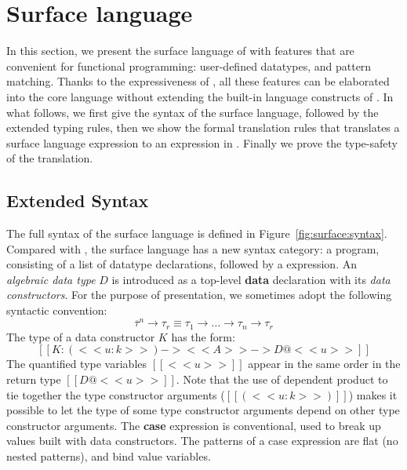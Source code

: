 \newcommand{\FV}{\mathsf{FV}}
\newcommand{\dom}{\mathsf{dom}}

\section{Surface language}
\label{sec:surface}


\newcommand{\sufcc}{$\lambda C_{\mathsf{suf}}$\xspace}

In this section, we present the surface language of \name with features that are convenient for functional programming: user-defined datatypes, and pattern matching. Thanks to the expressiveness of \name, all these features can be elaborated into the core language without extending the built-in language constructs of \name. In what follows, we first give the syntax of the surface language, followed by the extended typing rules, then we show the formal translation rules that translates a surface language expression to an expression in \name. Finally we prove the type-safety of the translation.

\subsection{Extended Syntax}


The full syntax of the surface language is defined in Figure~\ref{fig:surface:syntax}. Compared with \name, the surface language has a new syntax category: a program, consisting of a list of datatype declarations, followed by a expression. An \emph{algebraic data type} $D$ is introduced as a top-level \textbf{data} declaration with its \emph{data constructors}. For the purpose of presentation, we sometimes adopt the following syntactic convention:
\[
\overline{\tau}^n \rightarrow \tau_r \equiv \tau_1 \rightarrow \dots \rightarrow \tau_n \rightarrow \tau_r
\]
The type of a data constructor $K$ has the form:
\[
[[K : (<<u:k>>) -> <<A>> -> D@<<u>>]]
\]
The quantified type variables $[[<<u>>]]$ appear in the same order in the return type $[[D@<<u>>]]$. Note that the use of dependent product to tie together the type constructor arguments ($[[(<<u:k>>)]]$) makes it possible to let the type of some type constructor arguments depend on other type constructor arguments. The \textbf{case} expression is conventional, used to break up values built with data constructors. The patterns of a case expression are flat (no nested patterns), and bind value variables.

